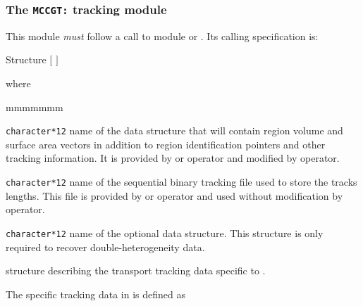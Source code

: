 \subsubsection{The {\tt MCCGT:} tracking module}\label{sect:MCCGData}

This module {\sl must} follow a call to module  or . Its calling
specification is:

\begin{DataStructure}{Structure }
 \moc{:=}    
$[$  $]$ \moc{::} 
\end{DataStructure}

\noindent  where
\begin{ListeDeDescription}{mmmmmmm}

\item[\dusa{TRKNAM}] {\tt character*12} name of the  data
structure that will contain region volume and surface area vectors in
addition to region identification pointers and other tracking information. It is provided by  or  operator and modified by  operator.

\item[\dusa{TRKFIL}] {\tt character*12} name of the sequential binary tracking file used to store the tracks lengths. This file is provided by  or  operator and used without modification by  operator.

\item[\dusa{GEONAM}] {\tt character*12} name of the optional  data
structure. This structure is only required to recover double-heterogeneity data.

\item[\dstr{descmccg}] structure describing the transport tracking data
specific to .

\end{ListeDeDescription}

\vskip 0.15cm

The  specific tracking data in  is defined as

